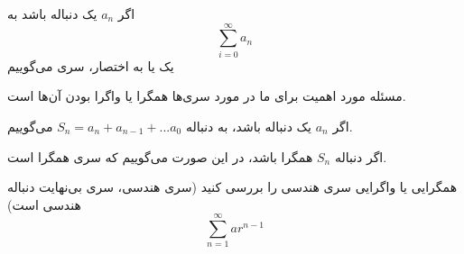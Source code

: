 
\begin{DEFINITION}
    اگر 
    $a_n$
    یک دنباله باشد به
    \[\sum_{i=0}^{\infty}a_n\]
    یک 
    یا به اختصار، سری می‌گوییم
\end{DEFINITION}
مسئله مورد اهمیت برای ما در مورد سری‌ها همگرا یا واگرا بودن آن‌ها است.
\begin{DEFINITION}
    اگر
    $a_n$
    یک دنباله باشد،
    به دنباله
    $S_n=a_n+a_{n-1}+...a_0$
    می‌گوییم.
\end{DEFINITION}


\begin{THEOREM}
    اگر دنباله 
    $S_n$
    همگرا باشد، در این صورت می‌گوییم که سری همگرا است.
\end{THEOREM}

\begin{PROBLEM}
    همگرایی یا واگرایی سری هندسی را بررسی کنید
    (سری هندسی، سری بی‌نهایت دنباله هندسی است)
    \[\sum_{n=1}^{\infty}ar^{n-1}\]
\end{PROBLEM}

